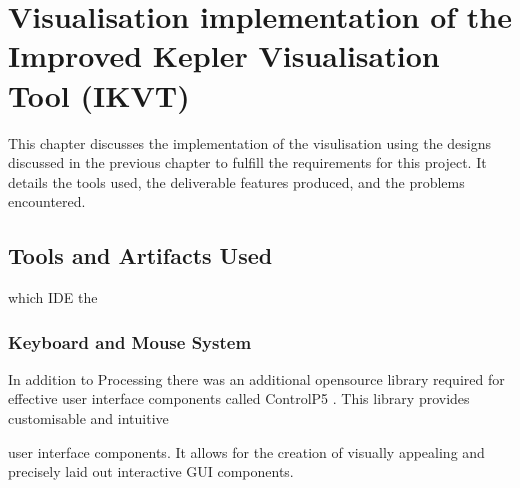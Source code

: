 \chapter{Visualisation implementation of the Improved Kepler Visualisation Tool
(IKVT)}\label{C:sd}
This chapter discusses the implementation of the visulisation using the designs
discussed in the previous chapter to fulfill the requirements for this project.
It details the tools used, the deliverable features
produced, and the problems encountered. 

\section{Tools and Artifacts Used}
which
% 
IDE
the

\subsection{Keyboard and Mouse System}
In addition to Processing there was an additional opensource
library required for effective user interface components called ControlP5
\cite{controlp5}. This library provides customisable and intuitive

user interface components. It allows for the creation of visually appealing and
precisely
laid out interactive GUI components.

